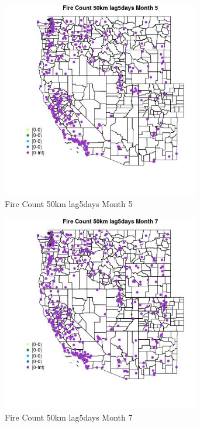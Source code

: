 \begin{figure} 
\centering  
\includegraphics[width=0.77\textwidth]{Code_Outputs/Report_ML_input_PM25_Step4_part_e_de_duplicated_aves_compiled_2019-05-18wNAs_MapObsMo5Fire_Count_50km_lag5days.jpg} 
\caption{\label{fig:Report_ML_input_PM25_Step4_part_e_de_duplicated_aves_compiled_2019-05-18wNAsMapObsMo5Fire_Count_50km_lag5days}Fire Count 50km lag5days Month 5} 
\end{figure} 
 

\begin{figure} 
\centering  
\includegraphics[width=0.77\textwidth]{Code_Outputs/Report_ML_input_PM25_Step4_part_e_de_duplicated_aves_compiled_2019-05-18wNAs_MapObsMo7Fire_Count_50km_lag5days.jpg} 
\caption{\label{fig:Report_ML_input_PM25_Step4_part_e_de_duplicated_aves_compiled_2019-05-18wNAsMapObsMo7Fire_Count_50km_lag5days}Fire Count 50km lag5days Month 7} 
\end{figure} 
 

